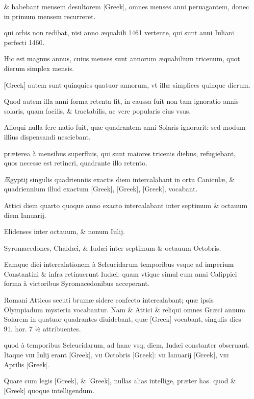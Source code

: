 \begin{parnumbers}

\& habebant mensem desultorem  \textgreek{[Greek]}, omnes menses anni peruagantem, donec in primum mensem recurreret.

qui orbis non redibat, nisi anno æquabili 1461 vertente, qui sunt anni Iuliani perfecti 1460.

Hic est magnus annus, cuius menses sunt annorum æquabilium tricenum, quot dierum simplex mensis.

\textgreek{[Greek]} autem sunt quinquies quatuor annorum, vt illæ simplices quinque dierum.

Quod autem illa anni forma retenta fit, in caussa fuit non tam ignoratio annis solaris, quam facilis, \& tractabilis, ac vere popularis eius vsus.

Alioqui nulla fere natio fuit, quæ quadrantem anni Solaris ignorarit: sed modum illius dispensandi nesciebant.

præterea à mensibus superfluis, qui sunt maiores tricenis diebus, refugiebant, quos necesse est retincri, quadrante illo retento. 

Ægyptij singulis quadrienniis exactis diem intercalabant in ortu Caniculæ, \& quadriennium illud exactum \textgreek{[Greek]}, \textgreek{[Greek]}, \textgreek{[Greek]}, vocabant.

Attici diem quarto quoque anno exacto intercalabant inter septimum \& octauum diem Ianuarij.

Elidenses inter octauum, \& nonum Iulij.

Syromacedones, Chaldæi, \& Iudæi inter septimum \& octauum Octobris.

Eamque diei intercalationem à Seleucidarum temporibus vsque ad imperium Constantini \& infra retinuerunt Iudæi: quam vtique simul cum anni Calippici forma à victoribus Syromacedonibus acceperant.

Romani Atticos secuti brumæ sidere confecto intercalabant; quæ ipsis Olympiadum mysteria vocabantur. Nam \& Attici \& reliqui omnes Græci annum Solarem in  quatuor quadrantes diuidebant, quæ \textgreek{[Greek]} vocabant, singulis dies 91. hor. 7 ½ attribuentes.

quod à temporibus Seleucidarum, ad hanc vsq; diem, Iudæi constanter obseruant. Itaque \textsc{viii} Iulij erant \textgreek{[Greek]}, \textsc{vii} Octobris \textgreek{[Greek]}: \textsc{vii} Ianuarij \textgreek{[Greek]}, \textsc{viii} Aprilis \textgreek{[Greek]}.

Quare cum legis \textgreek{[Greek]}, \& \textgreek{[Greek]}, nullas alias intellige, præter has. quod \& \textgreek{[Greek]} quoque intelligendum.


\end{parnumbers}
